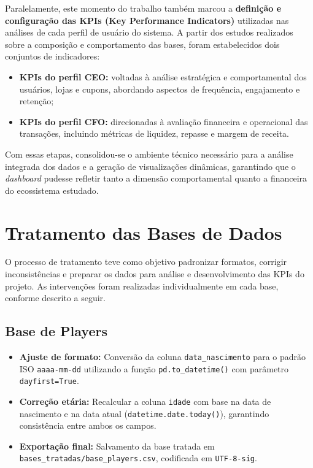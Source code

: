 \documentclass[12pt]{article}
\begin{document}
Paralelamente, este momento do trabalho também marcou a \textbf{definição e configuração das KPIs (Key Performance Indicators)} utilizadas nas análises de cada perfil de usuário do sistema. A partir dos estudos realizados sobre a composição e comportamento das bases, foram estabelecidos dois conjuntos de indicadores:
\begin{itemize}
    \item \textbf{KPIs do perfil CEO:} voltadas à análise estratégica e comportamental dos usuários, lojas e cupons, abordando aspectos de frequência, engajamento e retenção;
    \item \textbf{KPIs do perfil CFO:} direcionadas à avaliação financeira e operacional das transações, incluindo métricas de liquidez, repasse e margem de receita.
\end{itemize}

Com essas etapas, consolidou-se o ambiente técnico necessário para a análise integrada dos dados e a geração de visualizações dinâmicas, garantindo que o \textit{dashboard} pudesse refletir tanto a dimensão comportamental quanto a financeira do ecossistema estudado.

\section{Tratamento das Bases de Dados}

O processo de tratamento teve como objetivo padronizar formatos, corrigir inconsistências e preparar os dados para análise e desenvolvimento das KPIs do projeto. As intervenções foram realizadas individualmente em cada base, conforme descrito a seguir.

\subsection{Base de Players}
\begin{itemize}
    \item \textbf{Ajuste de formato:} Conversão da coluna \texttt{data\_nascimento} para o padrão ISO \texttt{aaaa-mm-dd} utilizando a função \texttt{pd.to\_datetime()} com parâmetro \texttt{dayfirst=True}.
    \item \textbf{Correção etária:} Recalcular a coluna \texttt{idade} com base na data de nascimento e na data atual (\texttt{datetime.date.today()}), garantindo consistência entre ambos os campos.
    \item \textbf{Exportação final:} Salvamento da base tratada em \texttt{bases\_tratadas/base\_players.csv}, codificada em \texttt{UTF-8-sig}.
\end{itemize}
\end{document}
